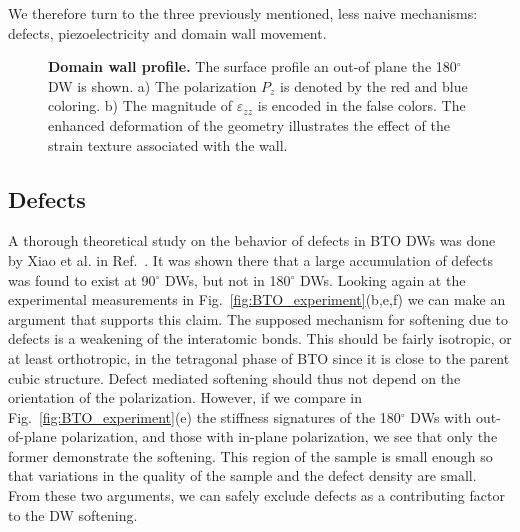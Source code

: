 We therefore turn to the three previously mentioned, less naive mechanisms: defects, piezoelectricity and domain wall movement.

\begin{figure}[h]
	\caption{\label{fig:BTO_wall} {\bf Domain wall profile.} The surface profile an out-of plane the 180$^\circ$ DW is shown. a) The polarization $P_z$ is denoted by the red and blue coloring. b) The magnitude of $\varepsilon_{zz}$ is encoded in the false colors. The enhanced deformation of the geometry illustrates the effect of the strain texture associated with the wall.}
\end{figure}

\subsection{Defects}
A thorough theoretical study on the behavior of defects in BTO DWs was done by Xiao et al. in Ref.~\cite{Xiao2005}.
It was shown there that a large accumulation of defects was found to exist at 90$^\circ$ DWs, but not in 180$^\circ$ DWs.
Looking again at the experimental measurements in Fig.~\ref{fig:BTO_experiment}(b,e,f) we can make an argument that supports this claim.
The supposed mechanism for softening due to defects is a weakening of the interatomic bonds.
This should be fairly isotropic, or at least orthotropic, in the tetragonal phase of BTO since it is close to the parent cubic structure.
Defect mediated softening should thus not depend on the orientation of the polarization.
However, if we compare in Fig.~\ref{fig:BTO_experiment}(e) the stiffness signatures of the 180$^\circ$ DWs with out-of-plane polarization, and those with in-plane polarization, we see that only the former demonstrate the softening.
This region of the sample is small enough so that variations in the quality of the sample and the defect density are small.
From these two arguments, we can safely exclude defects as a contributing factor to the DW softening.

